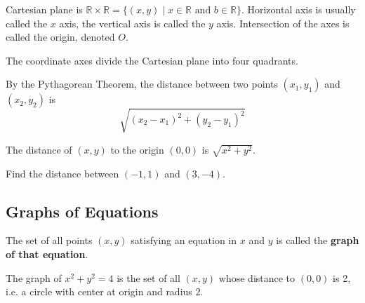 \documentclass[../main.tex]{subfiles}
\begin{document}
  \begin{minipage}[c]{0.5\textwidth}
    Cartesian plane is $\mathbb{R}\times \mathbb{R} = \{(x,y) \mid x \in \mathbb{R} \text{ and } b \in \mathbb{R} \}$. Horizontal axis is usually called the $x$ axis, the vertical axis is called the $y$ axis. Intersection of the axes is called the origin, denoted $O$.
  \end{minipage}
  \begin{minipage}[c]{0.5\textwidth}
    \begin{figure}[H]
      \centering
      
    \end{figure}
  \end{minipage}

  \begin{minipage}[c]{0.5\textwidth}
    The coordinate axes divide the Cartesian plane into four quadrants.
  \end{minipage}
  \begin{minipage}[c]{0.5\textwidth}
    \begin{figure}[H]
      \centering
      
    \end{figure}
  \end{minipage}

  \begin{minipage}[c]{0.5\textwidth}
    By the Pythagorean Theorem, the distance between two points $(x_1, y_1)$ and $(x_2, y_2)$ is
    \[
      \sqrt{(x_2-x_1)^2 + (y_2-y_1)^2}
    \]
  \end{minipage}
  \begin{minipage}[c]{0.5\textwidth}
    \begin{figure}[H]
      \centering
      
    \end{figure}
  \end{minipage}

  The distance of $(x,y)$ to the origin $(0,0)$ is $\sqrt{x^2+y^2}$.
  \begin{example}
    Find the distance between $(-1, 1)$ and $(3, -4)$.
  \end{example}

  \subsection*{Graphs of Equations}
  The set of all points $(x,y)$ satisfying an equation in $x$ and $y$ is called the \textbf{graph of that equation}.

  \begin{example}
    The graph of $x^2+y^2=4$ is the set of all $(x,y)$ whose distance to $(0,0)$ is 2, i.e. a circle with center at origin and radius 2.
  \end{example}
\end{document}
